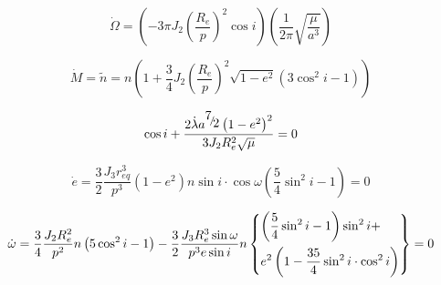 \documentclass{article}
\begin{document}
\begin{equation}
\dot \Omega  = \left( { - 3\pi J_2 \left( {\frac{{R_e }}
{p}} \right)^2 \cos i} \right)\left( {\frac{1}
{{2\pi }}\sqrt {\frac{\mu }
{{a^3 }}} } \right)
\end{equation}

\begin{equation}
\dot M = \tilde n = n\left( {1 + \frac{3}
{4}J_2 \left( {\frac{{R_e }}
{p}} \right)^2 \sqrt {1 - e^2 } \left( {3\cos ^2 i - 1} \right)} \right)
\end{equation}


\begin{equation}
\cos i + \frac{{2\dot \lambda a^{{\raise0.7ex\hbox{$7$} \!\mathord{\left/
 {\vphantom {7 2}}\right.\kern-\nulldelimiterspace}
\!\lower0.7ex\hbox{$2$}}} \left( {1 - e^2 } \right)^2 }}
{{3J_2 R_e ^2 \sqrt \mu  }} = 0
\end{equation}


\begin{equation}
\dot e = \frac{3}
{2}\frac{{J_3 r_{eq}^3 }}
{{p^3 }}\left( {1 - e^2 } \right)n\sin i \cdot \cos \omega \left( {\frac{5}
{4}\sin ^2 i - 1} \right) = 0
\end{equation}

\begin{equation}
\dot \omega  = \frac{3}
{4}\frac{{J_2 R_e^2 }}
{{p^2 }}n\left( {5\cos ^2 i - 1} \right) - \frac{3}
{2}\frac{{J_3 R_e^3 \sin \omega }}
{{p^3 e\sin i}}n\left\{ \begin{gathered}
  \left( {\frac{5}
{4}\sin ^2 i - 1} \right)\sin ^2 i +  \hfill \\
  e^2 \left( {1 - \frac{{35}}
{4}\sin ^2 i \cdot \cos ^2 i} \right) \hfill \\ 
\end{gathered}  \right\} = 0
\end{equation}
\end{document}
